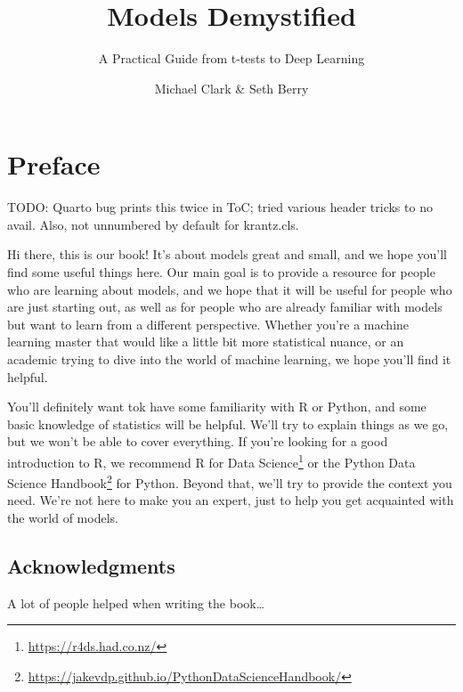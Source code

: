 \documentclass[
  letterpaper,
]{krantz}
\title{Models Demystified}
\subtitle{A Practical Guide from t-tests to Deep Learning}
\author{Michael Clark \& Seth Berry}
\date{}
\renewcommand*\contentsname{Table of contents}
\newcommand\contentsname{Table of contents}
\DeclareRobustCommand{\href}[2]{#2\footnote{\url{#1}}}
\begin{document}
\maketitle
{}

\renewcommand*\contentsname{Contents}
{
\setcounter{tocdepth}{2}
\tableofcontents
}

\chapter*{Preface}\label{preface}


TODO: Quarto bug prints this twice in ToC; tried various header tricks
to no avail. Also, not unnumbered by default for krantz.cls.

Hi there, this is our book! It's about models great and small, and we
hope you'll find some useful things here. Our main goal is to provide a
resource for people who are learning about models, and we hope that it
will be useful for people who are just starting out, as well as for
people who are already familiar with models but want to learn from a
different perspective. Whether you're a machine learning master that
would like a little bit more statistical nuance, or an academic trying
to dive into the world of machine learning, we hope you'll find it
helpful.

You'll definitely want tok have some familiarity with R or Python, and
some basic knowledge of statistics will be helpful. We'll try to explain
things as we go, but we won't be able to cover everything. If you're
looking for a good introduction to R, we recommend
\href{https://r4ds.had.co.nz/}{R for Data Science} or the
\href{https://jakevdp.github.io/PythonDataScienceHandbook/}{Python Data
Science Handbook} for Python. Beyond that, we'll try to provide the
context you need. We're not here to make you an expert, just to help you
get acquainted with the world of models.

\section*{Acknowledgments}\label{acknowledgments}


A lot of people helped when writing the book\ldots{}

\end{document}
